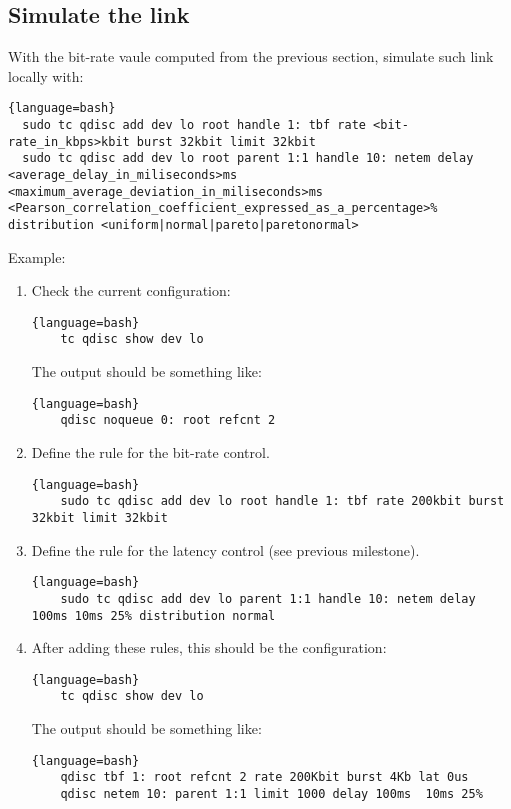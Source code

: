 \subsection{Simulate the link}

With the bit-rate vaule computed from the previous section, simulate
such link locally with:

\begin{lstlisting}{language=bash}
  sudo tc qdisc add dev lo root handle 1: tbf rate <bit-rate_in_kbps>kbit burst 32kbit limit 32kbit
  sudo tc qdisc add dev lo root parent 1:1 handle 10: netem delay <average_delay_in_miliseconds>ms <maximum_average_deviation_in_miliseconds>ms <Pearson_correlation_coefficient_expressed_as_a_percentage>% distribution <uniform|normal|pareto|paretonormal>
\end{lstlisting}

Example:

\begin{enumerate}
\item Check the current configuration:
  
  \begin{lstlisting}{language=bash}
    tc qdisc show dev lo
  \end{lstlisting}
  
  The output should be something like:
  
  \begin{lstlisting}{language=bash}
    qdisc noqueue 0: root refcnt 2
  \end{lstlisting}
  
\item Define the rule for the bit-rate control.
  
  \begin{lstlisting}{language=bash}
    sudo tc qdisc add dev lo root handle 1: tbf rate 200kbit burst 32kbit limit 32kbit
  \end{lstlisting}
  
\item Define the rule for the latency control (see previous milestone).
  
  \begin{lstlisting}{language=bash}
    sudo tc qdisc add dev lo parent 1:1 handle 10: netem delay 100ms 10ms 25% distribution normal
  \end{lstlisting}
  
\item After adding these rules, this should be the configuration:
  
  \begin{lstlisting}{language=bash}
    tc qdisc show dev lo
  \end{lstlisting}
  
  The output should be something like:
  
  \begin{lstlisting}{language=bash}
    qdisc tbf 1: root refcnt 2 rate 200Kbit burst 4Kb lat 0us 
    qdisc netem 10: parent 1:1 limit 1000 delay 100ms  10ms 25%
  \end{lstlisting}

\end{enumerate}

